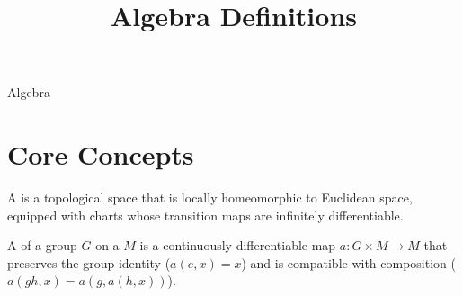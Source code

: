 \documentclass[hidelinks]{article}
\title{Algebra Definitions}
\author{}
\date{}
\begin{document}
\maketitle

\begin{smodule}[title={Algebra}]{Algebra}

    \section{Core Concepts}

    \begin{sdefinition}[for=manifold]
        A  is a topological space that is locally homeomorphic to Euclidean space, equipped with charts whose transition maps are infinitely differentiable. 
    \end{sdefinition}

    \begin{sdefinition}[for=group action]
        A  of a group $G$ on a  $M$ is a continuously differentiable map $a \colon G \times M \to M$ that preserves the group identity ($a(e, x) = x$) and is compatible with composition ($a(g h, x) = a(g, a(h, x))$).
    \end{sdefinition}

\end{smodule}
\end{document}
